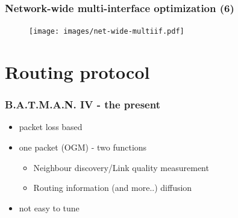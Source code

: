 \documentclass[slidestop]{beamer}
\begin{document}
\begin{frame}[c]
	\frametitle{Network-wide multi-interface optimization (6)}

	\begin{figure}
		\centering
		\texttt{[image: images/net-wide-multiif.pdf]}
	\end{figure}
\end{frame}

\section{Routing protocol}
\begin{frame}[c]
	\frametitle{B.A.T.M.A.N. IV - the present}
	\begin{itemize}
		\item packet loss based
		\item one packet (OGM) - two functions
			\begin{itemize}
				\item Neighbour discovery/Link quality
					measurement
				\item Routing information (and more..) diffusion
			\end{itemize}
		\item not easy to tune
	\end{itemize}
\end{frame}
\end{document}
